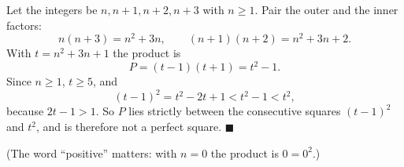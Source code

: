 Let the integers be $n,n+1,n+2,n+3$ with $n\ge1$. Pair the outer and the inner factors:
\[
n(n+3)=n^2+3n,\qquad (n+1)(n+2)=n^2+3n+2 .
\]
With $t=n^2+3n+1$ the product is
\[
P=(t-1)(t+1)=t^2-1 .
\]
Since $n\ge1$, $t\ge5$, and
\[
(t-1)^2=t^2-2t+1<t^2-1<t^2 ,
\]
because $2t-1>1$. So $P$ lies strictly between the consecutive squares $(t-1)^2$ and $t^2$, and is therefore not a perfect square. $\blacksquare$

(The word ``positive'' matters: with $n=0$ the product is $0=0^2$.)

